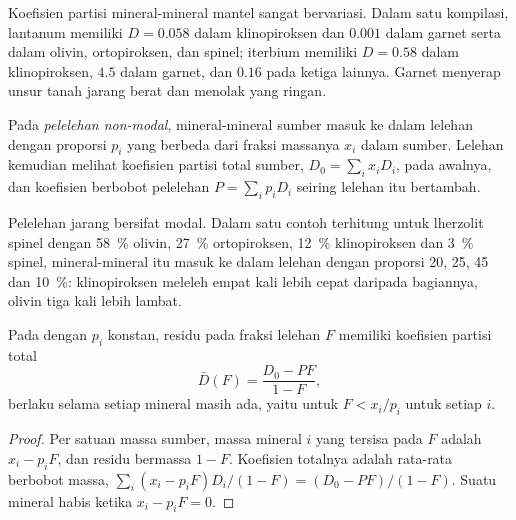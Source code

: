 Koefisien partisi mineral-mineral mantel sangat bervariasi. Dalam satu
kompilasi, lantanum memiliki $D = 0.058$ dalam klinopiroksen dan $0.001$ dalam
garnet serta dalam olivin, ortopiroksen, dan spinel; iterbium memiliki $D = 0.58$ dalam
klinopiroksen, $4.5$ dalam garnet, dan $0.16$ pada ketiga lainnya. Garnet
menyerap unsur tanah jarang berat dan menolak yang ringan.

\begin{definition}\label{def:b3:trace-element-modelling:nonmodal}
Pada \emph{pelelehan non-modal}, mineral-mineral
sumber masuk ke dalam lelehan dengan proporsi $p_i$ yang berbeda dari fraksi
massanya $x_i$ dalam sumber. Lelehan kemudian melihat koefisien partisi total
sumber, $D_0 = \sum_i x_iD_i$, pada awalnya, dan koefisien berbobot pelelehan
$P = \sum_i p_iD_i$ seiring lelehan itu bertambah.
\end{definition}

Pelelehan jarang bersifat modal. Dalam satu contoh terhitung untuk lherzolit spinel dengan
\qty{58}{\percent} olivin, \qty{27}{\percent} ortopiroksen,
\qty{12}{\percent} klinopiroksen dan \qty{3}{\percent} spinel, mineral-mineral itu
masuk ke dalam lelehan dengan proporsi 20, 25, 45 dan \qty{10}{\percent}:
klinopiroksen meleleh empat kali lebih cepat daripada bagiannya, olivin tiga kali
lebih lambat.

\begin{proposition}
\label{prop:b3:trace-element-modelling:residue}
Pada  dengan $p_i$ konstan, residu pada fraksi lelehan $F$
memiliki koefisien partisi total
\[
\bar D(F) = \frac{D_0 - PF}{1 - F},
\]
berlaku selama setiap mineral masih ada, yaitu untuk $F < x_i/p_i$ untuk setiap $i$.
\end{proposition}

\begin{proof}
Per satuan massa sumber, massa mineral $i$ yang tersisa pada $F$ adalah $x_i - p_iF$,
dan residu bermassa $1 - F$. Koefisien totalnya adalah rata-rata berbobot massa,
$\sum_i (x_i - p_iF)D_i/(1 - F) = (D_0 - PF)/(1 - F)$. Suatu mineral habis
ketika $x_i - p_iF = 0$.
\end{proof}

